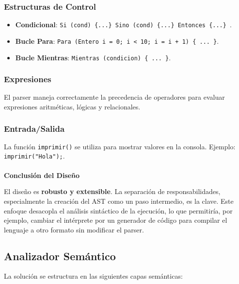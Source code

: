 \documentclass{article}
\begin{document}
\subsubsection{Estructuras de Control}
\begin{itemize}
    \item \textbf{Condicional}: \texttt{Si (cond) \{...\} Sino (cond) \{...\} Entonces \{...\} }.
    \item \textbf{Bucle Para}: \texttt{Para (Entero i = 0; i < 10; i = i + 1) \{ ... \}}.
    \item \textbf{Bucle Mientras}: \texttt{Mientras (condicion) \{ ... \}}.
\end{itemize}

\subsubsection{Expresiones}
El parser maneja correctamente la precedencia de operadores para evaluar expresiones aritméticas, lógicas y relacionales.

\subsubsection{Entrada/Salida}
La función \texttt{imprimir()} se utiliza para mostrar valores en la consola. Ejemplo: \texttt{imprimir("Hola");}.
\\\\

\textbf{Conclusión del Diseño}

El diseño es \textbf{robusto y extensible}. La separación de responsabilidades, especialmente la creación del AST como un paso intermedio, es la clave. Este enfoque desacopla el análisis sintáctico de la ejecución, lo que permitiría, por ejemplo, cambiar el intérprete por un generador de código para compilar el lenguaje a otro formato sin modificar el parser.
\subsection{Analizador Semántico}\label{sec:dis}

La solución se estructura en las siguientes capas semánticas:
\end{document}
